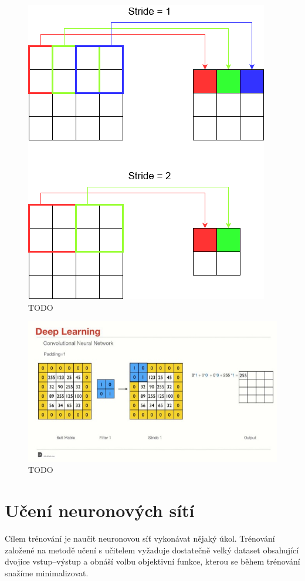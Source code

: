 \begin{figure}[H]
    \centering
    \includegraphics[scale=0.5]{obrazky-figures/stride.png}
    \caption{\label{fig:conv_stride}TODO}
\end{figure}


\begin{figure}[H]
    \centering
    \includegraphics[scale=0.5]{obrazky-figures/padding.jpg}
    \caption{\label{fig:conv_padding}TODO}
\end{figure}


\section{Učení neuronových sítí}
Cílem trénování je naučit neuronovou síť vykonávat nějaký úkol. Trénování založené na metodě učení s učitelem vyžaduje dostatečně velký dataset obsahující dvojice vstup--výstup a obnáší volbu objektivní funkce, kterou se během trénování snažíme minimalizovat. 

